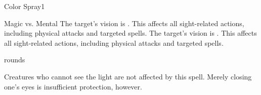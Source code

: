 \begin{spellsection}{Color Spray}{1}
    \begin{spellheader}
    \end{spellheader}
    \begin{spellcontent}
        \begin{spelltargetinginfo}
        \end{spelltargetinginfo}
        \begin{spelleffects}
            \begin{spellattack}{Magic vs. Mental}
                \spellsuccess The target's vision is \impaired. This affects all sight-related actions, including physical attacks and targeted spells.
                \spellcritical The target's vision is \severelyimpaired. This affects all sight-related actions, including physical attacks and targeted spells.
            \end{spellattack}
             rounds
        \end{spelleffects}
    \end{spellcontent}
    \begin{spellfooter}
        \spellnotes Creatures who cannot see the light are not affected by this spell. Merely closing one's eyes is insufficient protection, however.
        \miscastexplode
    \end{spellfooter}
\end{spellsection}

